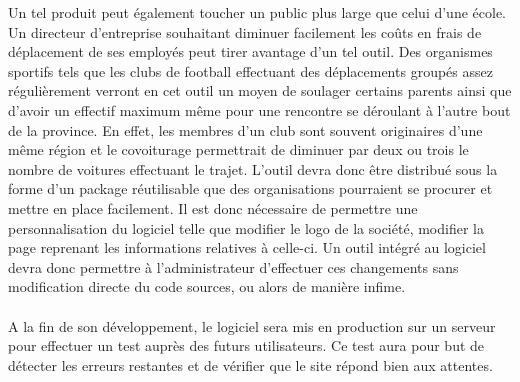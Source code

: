 \documentclass[12pt, a4paper, oneside]{article}
\begin{document}
    \indent Un tel produit peut également toucher un public plus large que celui d'une école. Un directeur d'entreprise souhaitant diminuer facilement les coûts en frais de déplacement de ses employés peut tirer avantage d'un tel outil. Des organismes sportifs tels que les clubs de football effectuant des déplacements groupés assez régulièrement verront en cet outil un moyen de soulager certains parents ainsi que d'avoir un effectif maximum même pour une rencontre se déroulant à l'autre bout de la province. En effet, les membres d'un club sont souvent originaires d'une même région et le covoiturage permettrait de diminuer par deux ou trois le nombre de voitures effectuant le trajet. L'outil devra donc être distribué sous la forme d'un package réutilisable que des organisations pourraient se procurer et mettre en place facilement. Il est donc nécessaire de permettre une personnalisation du logiciel telle que modifier le logo de la société, modifier la page reprenant les informations relatives à celle-ci. Un outil intégré au logiciel devra donc permettre à l'administrateur d'effectuer ces changements sans modification directe du code sources, ou alors de manière infime.\\\\
    \indent A la fin de son développement, le logiciel sera mis en production sur un serveur pour effectuer un test auprès des futurs utilisateurs. Ce test aura pour but de détecter les erreurs restantes et de vérifier que le site répond bien aux attentes.
\end{document}
